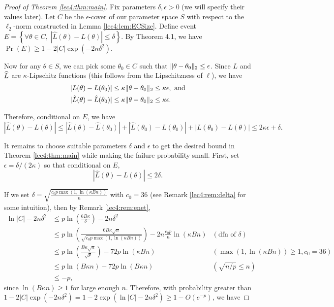 \begin{proof}[Proof of Theorem \ref{lec4:thm:main}]
Fix parameters $\delta, \epsilon>0$ (we will specify their values later). Let $C$ be the $\epsilon$-cover of our parameter space $S$ with respect to the $\ell_2$-norm constructed in Lemma \ref{lec4:lem:ECSize}. Define event $E = \left\{ \forall \theta \in C, \; |\hat L(\theta) - L(\theta)| \le \delta \right\}$. By Theorem 4.1, we have $\Pr (E) \ge 1 - 2|C|\exp(-2n\delta^2)$.

Now for any $\theta \in S$, we can pick some $\theta_0 \in C$ such that $\|\theta-\theta_0\|_2 \le \epsilon$. Since $L$ and $\widehat{L}$ are $\kappa$-Lipschitz functions (this follows from the Lipschitzness of $\ell$), we have
\begin{align}
|L(\theta) - L(\theta_0)| &\le \kappa \|\theta-\theta_0\|_2 \le \kappa \epsilon, \text{ and} \\
|\hat L(\theta) - \hat L(\theta_0)| &\le \kappa \|\theta-\theta_0\|_2 \le \kappa \epsilon.
\end{align}

Therefore, conditional on $E$, we have
\begin{equation}
    |\hat L(\theta) -  L(\theta)| \le |\hat L(\theta)-\hat L(\theta_0)| + |\hat L(\theta_0) -  L(\theta_0)| + | L(\theta_0) - L(\theta)| \le 2 \kappa\epsilon+\delta.
\end{equation}

It remains to choose suitable parameters $\delta$ and $\epsilon$ to get the desired bound in Theorem \ref{lec4:thm:main} while making the failure probability small. First, set $\epsilon = \delta / (2 \kappa)$ so that conditional on $E$,
\begin{equation} \label{lec4:eqn:triangle}
    |\hat L(\theta) -  L(\theta)| \le 2\delta.
\end{equation}

If we set $\delta = \sqrt{\frac{c_0 p \max(1, \ln{(\kappa Bn)})}{n}}$ with $c_0 = 36$ (see Remark \ref{lec4:rem:delta} for some intuition), then by Remark \ref{lec4:rem:enet},
\begin{align}
\ln{\vert C \vert} - 2n\delta^2 &\leq p \ln\left(\frac{6B \kappa}{\delta}\right) - 2n\delta^2 \\
&\leq p \ln\left(\frac{6B\kappa \sqrt{n}}{ \sqrt{c_0 p \max(1, \ln{(\kappa Bn)})} }\right) - 2n \frac{c_0p}{n} \ln(\kappa Bn) &(\text{dfn of } \delta)  \\
&\leq p\ln\left(\frac{B\kappa \sqrt{n}}{\sqrt{p}}\right) - 72 p \ln(\kappa Bn) &(\max(1, \ln{(\kappa Bn)}) \geq 1, c_0 = 36) \\
&\leq p \ln(B\kappa n) - 72 p \ln(B\kappa n) &(\sqrt{n/p} \leq n) \\
&\leq -p,
\end{align}
since $\ln (B\kappa n) \geq 1$ for large enough $n$. Therefore, with probability greater than $1 - 2|C| \exp(-2n\delta^2) = 1 - 2 \exp(\ln{|C|} - 2n\delta^2) \geq 1 - O(e^{-p})$, we have
\end{proof}

